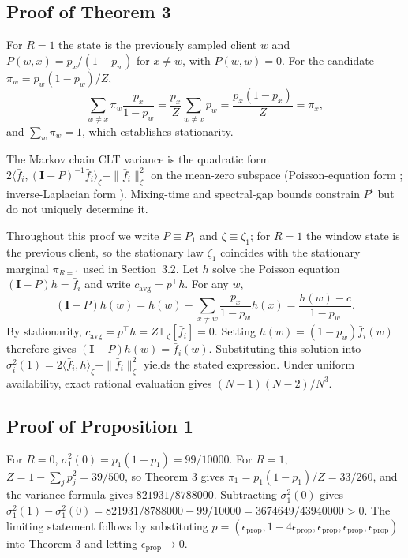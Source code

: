 \documentclass[twoside,11pt]{article}
\begin{document}
\subsection{Proof of Theorem 3}
For $R=1$ the state is the previously sampled client $w$ and $P(w,x)=p_x/(1-p_w)$ for $x\neq w$, with $P(w,w)=0$. For the candidate $\pi_w=p_w(1-p_w)/Z$,
\begin{equation}\label{eq:e37}
\sum_{w\neq x}\pi_w\dfrac{p_x}{1-p_w}=\dfrac{p_x}{Z}\sum_{w\neq x}p_w=\dfrac{p_x(1-p_x)}{Z}=\pi_x,
\end{equation}
and $\sum_w\pi_w=1$, which establishes stationarity.

The Markov chain CLT variance is the quadratic form $2\langle\bar f_i,(\mathbf{I}-P)^{-1}\bar f_i\rangle_{\zeta}-\|\bar f_i\|_{\zeta}^{2}$ on the mean-zero subspace (Poisson-equation form \citep{ref4}; inverse-Laplacian form \citep{ref20,ref21}). Mixing-time and spectral-gap bounds constrain $P^{t}$ but do not uniquely determine it.

Throughout this proof we write $P\equiv P_1$ and $\zeta\equiv\zeta_1$; for $R=1$ the window state is the previous client, so the stationary law $\zeta_1$ coincides with the stationary marginal $\pi_{R=1}$ used in Section~3.2. Let $h$ solve the Poisson equation $(\mathbf{I}-P)h=\bar f_i$ and write $c_{\mathrm{avg}}=p^{\top}h$. For any $w$,
\begin{equation}\label{eq:e38}
(\mathbf{I}-P)h(w)=h(w)-\sum_{x\neq w}\dfrac{p_x}{1-p_w}h(x)=\dfrac{h(w)-c}{1-p_w}.
\end{equation}
By stationarity, $c_{\mathrm{avg}}=p^{\top}h=Z\,\mathbb{E}_{\zeta}[\bar f_i]=0$. Setting $h(w)=(1-p_w)\bar f_i(w)$ therefore gives $(\mathbf{I}-P)h(w)=\bar f_i(w)$. Substituting this solution into $\sigma_i^{2}(1)=2\langle\bar f_i,h\rangle_{\zeta}-\|\bar f_i\|_{\zeta}^{2}$ yields the stated expression. Under uniform availability, exact rational evaluation gives $(N-1)(N-2)/N^{3}$.

\subsection{Proof of Proposition 1}
For $R=0$, $\sigma_1^{2}(0)=p_1(1-p_1)=99/10000$. For $R=1$, $Z=1-\sum_j p_j^{2}=39/500$, so Theorem 3 gives $\pi_1=p_1(1-p_1)/Z=33/260$, and the variance formula gives $821931/8788000$. Subtracting $\sigma_1^{2}(0)$ gives $\sigma_1^{2}(1)-\sigma_1^{2}(0)=821931/8788000-99/10000=3674649/43940000>0$. The limiting statement follows by substituting $p=(\epsilon_{\mathrm{prop}},1-4\epsilon_{\mathrm{prop}},\epsilon_{\mathrm{prop}},\epsilon_{\mathrm{prop}},\epsilon_{\mathrm{prop}})$ into Theorem 3 and letting $\epsilon_{\mathrm{prop}}\to0$.
\end{document}

